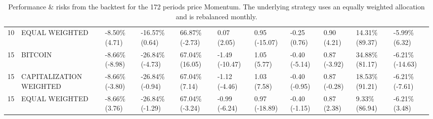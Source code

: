 \documentclass{article}
\begin{document}
\begin{landscape}
\begin{table}[H]
\begin{tabular}{p{0.4cm}|p{3cm}|p{1.65cm}|p{1.65cm}|p{1.65cm}|p{1.65cm}|p{1.65cm}|p{1.65cm}|p{1.65cm}|p{1.65cm}|p{1.65cm}}
\\ 
10&EQUAL WEIGHTED&-8.50\% (4.71)&-16.57\% (0.64)&66.87\% (-2.73)&0.07 (2.05)&0.95 (-15.07)&-0.25 (0.76)&0.90 (4.21)&14.31\% (89.37)&-5.99\% (6.32)
\\ 
15&BITCOIN&-8.66\% (-8.98)&-26.84\% (-4.73)&67.04\% (16.05)&-1.49 (-10.47)&1.05 (5.77)&-0.40 (-5.14)&0.87 (-3.92)&34.88\% (81.17)&-6.21\% (-14.63)
\\ 
15&CAPITALIZATION WEIGHTED&-8.66\% (-3.80)&-26.84\% (-0.94)&67.04\% (7.14)&-1.12 (-4.46)&1.03 (7.58)&-0.40 (-0.95)&0.87 (-0.28)&18.53\% (91.21)&-6.21\% (-7.61)
\\ 
15&EQUAL WEIGHTED&-8.66\% (3.76)&-26.84\% (-1.29)&67.04\% (-3.24)&-0.99 (-6.24)&0.97 (-18.89)&-0.40 (-1.15)&0.87 (2.38)&9.33\% (86.94)&-6.21\% (3.48)
\\ 
\bottomrule
  \end{tabular}
  \label{tab:mom172equalweight}
   \caption{Performance \& risks from the backtest for the 172 periods price Momentum. The underlying strategy uses an equally weighted allocation and is rebalanced monthly.}
\end{table}
\end{landscape}
\end{document}
